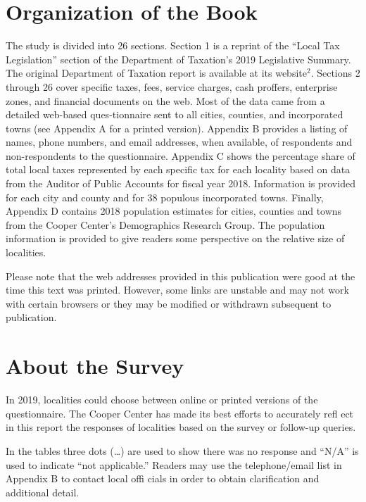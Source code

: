\documentclass[
]{book}
\begin{document}
\hypertarget{organization-of-the-book}{%
\section{Organization of the Book}\label{organization-of-the-book}}

The study is divided into 26 sections. Section 1 is a reprint of the ``Local Tax Legislation'' section of the Department of Taxation's 2019 Legislative Summary. The original Department of Taxation report is available at its website\(^2\). Sections 2 through 26 cover specific taxes, fees, service charges, cash proffers, enterprise zones, and financial documents on the web. Most of the data came from a detailed web-based ques-tionnaire sent to all cities, counties, and incorporated towns (see Appendix A for a printed version). Appendix B provides a listing of names, phone numbers, and email addresses, when available, of respondents and non-respondents to the questionnaire. Appendix C shows the percentage share of total local taxes represented by each specific tax for each locality based on data from the Auditor of Public Accounts for fiscal year 2018. Information is provided for each city and county and for 38 populous incorporated towns. Finally, Appendix D contains 2018 population estimates for cities, counties and towns from the Cooper Center's Demographics Research Group. The population information is provided to give readers some perspective on the relative size of localities.

Please note that the web addresses provided in this publication were good at the time this text was printed. However, some links are unstable and may not work with certain browsers or they may be modified or withdrawn subsequent to publication.

\hypertarget{about-the-survey}{%
\section{About the Survey}\label{about-the-survey}}

In 2019, localities could choose between online or printed versions of the questionnaire. The Cooper Center has made its best efforts to accurately refl ect in this report the responses of localities based on the survey or follow-up queries.

In the tables three dots (\ldots) are used to show there was no response and ``N/A'' is used to indicate ``not applicable.'' Readers may use the telephone/email list in Appendix B to contact local offi cials in order to obtain clarification and additional detail.
\end{document}
